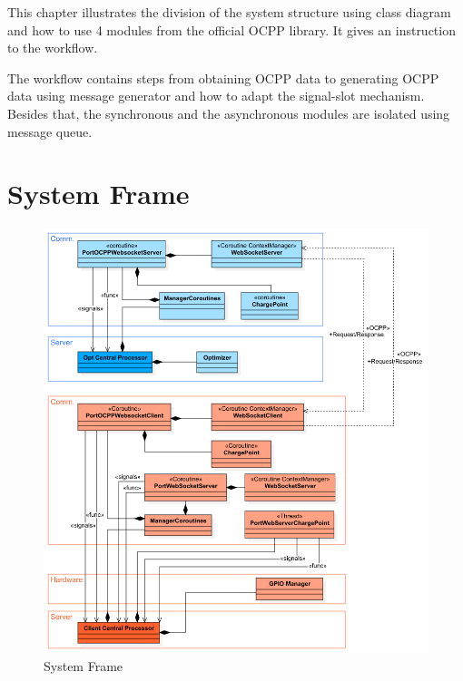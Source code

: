 \documentclass[
	english,
	ruledheaders=section,%
	class=report,%
	thesis={type=Report},%
	accentcolor=9c,%
	custommargins=true,%
	marginpar=false,%
	parskip=half-,%
	fontsize=11pt,%
	logofile={img/tuda_logo.pdf}, %
]{tudapub}
\begin{document}

This chapter illustrates the division of the system structure using class diagram and how to use 4 modules from the official \ac{OCPP} library. It gives an instruction to the workflow.

The workflow contains steps from obtaining \ac{OCPP} data to generating \ac{OCPP} data using message generator and how to adapt the signal-slot mechanism. Besides that, the synchronous and the asynchronous modules are isolated using message queue.




\section{System Frame}
\label{sec:SystemFrame}

\begin{figure}
    \centering
    \includegraphics[width=1\textwidth]{img/SimpleClassDiagram.png} 
    \caption{System Frame}
    \label{fig: SystemFrame}
\end{figure}
\end{document}

